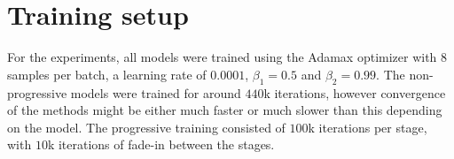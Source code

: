\section{Training setup}
For the experiments, all models were trained using the Adamax optimizer \parencite{kingma2014adam} with $8$ samples per batch, a learning rate of $0.0001$, $\beta_1 = 0.5$ and $\beta_2 = 0.99$. The non-progressive models were trained for around $440$k iterations, however convergence of the methods might be either much faster or much slower than this depending on the model. The progressive training consisted of $100$k iterations per stage, with $10$k iterations of fade-in between the stages. 

